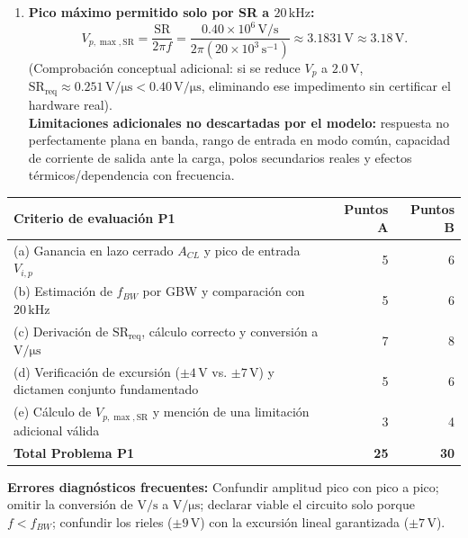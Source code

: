 \documentclass[10pt, a4paper]{article}
\begin{document}
\begin{enumerate}
    \item \textbf{Pico máximo permitido solo por SR a $20\,\mathrm{kHz}$:}
    \begin{equation}
        V_{p,\max,\mathrm{SR}} = \frac{\mathrm{SR}}{2\pi f} = \frac{0.40 \times 10^6\,\mathrm{V/s}}{2\pi (20 \times 10^3\,\mathrm{s^{-1}})} \approx 3.1831\,\mathrm{V} \approx 3.18\,\mathrm{V}.
    \end{equation}
    (Comprobación conceptual adicional: si se reduce $V_p$ a $2.0\,\mathrm{V}$, $\mathrm{SR}_{\mathrm{req}} \approx 0.251\,\mathrm{V/\mu s} < 0.40\,\mathrm{V/\mu s}$, eliminando ese impedimento sin certificar el hardware real).\\
    \textbf{Limitaciones adicionales no descartadas por el modelo:} respuesta no perfectamente plana en banda, rango de entrada en modo común, capacidad de corriente de salida ante la carga, polos secundarios reales y efectos térmicos/dependencia con frecuencia.
\end{enumerate}

\begin{table}[htbp]
    \centering
    \footnotesize
    \begin{tabularx}{\textwidth}{@{}Xrr@{}}
        \toprule
        \textbf{Criterio de evaluación P1} & \textbf{Puntos A} & \textbf{Puntos B} \\
        \midrule
        (a) Ganancia en lazo cerrado $A_{CL}$ y pico de entrada $V_{i,p}$ & 5 & 6 \\
        (b) Estimación de $f_{BW}$ por GBW y comparación con $20\,\mathrm{kHz}$ & 5 & 6 \\
        (c) Derivación de $\mathrm{SR}_{\mathrm{req}}$, cálculo correcto y conversión a $\mathrm{V/\mu s}$ & 7 & 8 \\
        (d) Verificación de excursión ($\pm 4\,\mathrm{V}$ vs. $\pm 7\,\mathrm{V}$) y dictamen conjunto fundamentado & 5 & 6 \\
        (e) Cálculo de $V_{p,\max,\mathrm{SR}}$ y mención de una limitación adicional válida & 3 & 4 \\
        \midrule
        \textbf{Total Problema P1} & \textbf{25} & \textbf{30} \\
        \bottomrule
    \end{tabularx}
\end{table}

\noindent\textbf{Errores diagnósticos frecuentes:} Confundir amplitud pico con pico a pico; omitir la conversión de $\mathrm{V/s}$ a $\mathrm{V/\mu s}$; declarar viable el circuito solo porque $f < f_{BW}$; confundir los rieles ($\pm 9\,\mathrm{V}$) con la excursión lineal garantizada ($\pm 7\,\mathrm{V}$).
\end{document}
